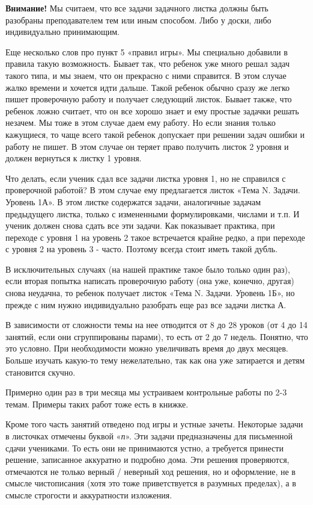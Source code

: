 \textbf{Внимание!} Мы считаем, что все задачи задачного листка должны быть разобраны преподавателем тем или иным способом. Либо у доски, либо индивидуально принимающим.

Еще несколько слов про пункт 5 «правил игры». Мы специально добавили в правила такую возможность. Бывает так, что ребенок уже много решал задач такого типа, и мы знаем, что он прекрасно с ними справится. В этом случае жалко времени и хочется идти дальше. Такой ребенок обычно сразу же легко пишет проверочную работу и получает следующий листок. Бывает также, что ребенок ложно считает, что он все хорошо знает и ему простые задачки решать незачем. Мы тоже в этом случае даем ему работу. Но если знания только кажущиеся, то чаще всего такой ребенок допускает при решении задач ошибки и работу не пишет. В этом случае он теряет право получить листок 2 уровня и должен вернуться к листку 1 уровня.

Что делать, если ученик сдал все задачи листка уровня 1, но не справился с проверочной работой? В этом случае ему предлагается листок «Тема N. Задачи. Уровень 1А». В этом листке содержатся задачи, аналогичные задачам предыдущего листка, только с измененными формулировками, числами и т.п. И ученик должен снова сдать все эти задачи. Как показывает практика, при переходе с уровня 1 на уровень 2 такое встречается крайне редко, а при переходе с уровня 2 на уровень 3 - часто. Поэтому всегда стоит иметь такой дубль.

В исключительных случаях (на нашей практике такое было только один раз), если вторая попытка написать проверочную работу (она уже, конечно, другая) снова неудачна, то ребенок получает листок «Тема N. Задачи. Уровень 1Б», но прежде с ним нужно индивидуально разобрать еще раз все задачи листка А.

В зависимости от сложности темы на нее отводится от 8 до 28 уроков (от 4 до 14 занятий, если они сгруппированы парами), то есть от 2 до 7 недель. Понятно, что это условно. При необходимости можно увеличивать время до двух месяцев. Больше изучать какую-то тему нежелательно, так как она уже затирается и детям становится скучно.

Примерно один раз в три месяца мы устраиваем контрольные работы по 2-3 темам. Примеры таких работ тоже есть в книжке.  

Кроме того часть занятий отведено под игры и устные зачеты. Некоторые задачи в листочках отмечены буквой «\textit{п}». Эти задачи предназначены для письменной сдачи учениками. То есть они не принимаются устно, а требуется принести решение, записанное аккуратно и подробно дома. Эти решения проверяются, отмечаются не только верный / неверный ход решения, но и оформление, не в смысле чистописания (хотя это тоже приветствуется в разумных пределах), а в смысле строгости и аккуратности изложения.

